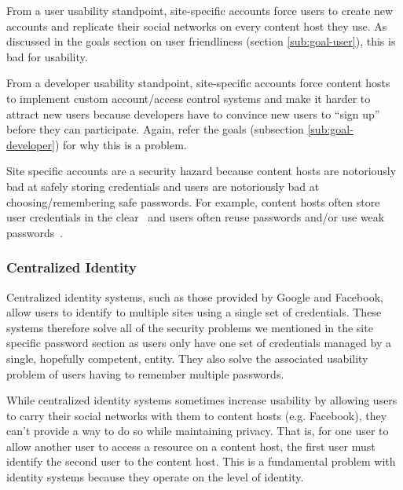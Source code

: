 \documentclass[pdftex,12pt,a4papaer]{report}
\begin{document}
From a user usability standpoint, site-specific accounts force users to create new
accounts and replicate their social networks on every content host they use. As
discussed in the goals section on user friendliness (section \ref{sub:goal-user}), this is
bad for usability.


From a developer usability standpoint, site-specific accounts force content
hosts to implement custom account/access control systems and make it harder to
attract new users because developers have to convince new users to ``sign up''
before they can participate. Again, refer the goals (subsection \ref{sub:goal-developer}) for
why this is a problem.


Site specific accounts are a security hazard because content hosts are
notoriously bad at safely storing credentials and users are notoriously bad at
choosing/remembering safe passwords. For example, content hosts often store user
credentials in the clear~\cite{plaintext} and users often reuse passwords and/or
use weak passwords~\cite{ms-passwords}.


\subsubsection{Centralized Identity}

Centralized identity systems, such as those provided by Google and Facebook,
allow users to identify to multiple sites using a single set of credentials.
These systems therefore solve all of the security problems we mentioned in the
site specific password section as users only have one set of credentials managed
by a single, hopefully competent, entity. They also solve the associated
usability problem of users having to remember multiple passwords.

While centralized identity systems sometimes increase usability by allowing
users to carry their social networks with them to content hosts (e.g. Facebook),
they can't provide a way to do so while maintaining privacy. That is, for one
user to allow another user to access a resource on a content host, the first
user must identify the second user to the content host. This is a fundamental
problem with identity systems because they operate on the level of identity.
\end{document}
